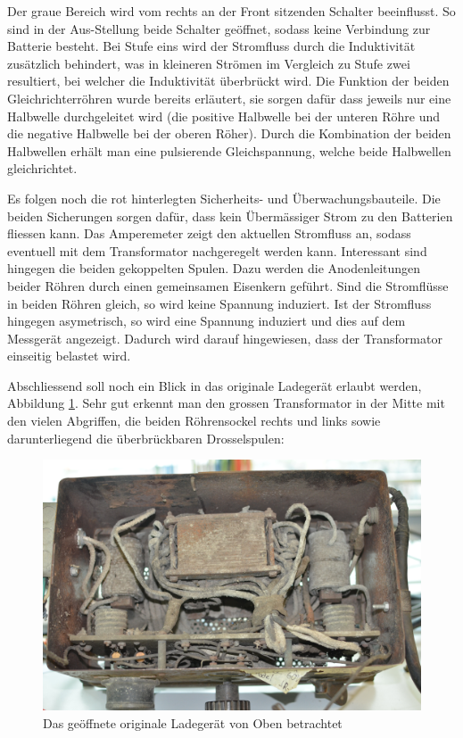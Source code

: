 Der graue Bereich wird vom rechts an der Front sitzenden Schalter beeinflusst. So sind in der Aus-Stellung beide Schalter geöffnet, sodass keine Verbindung zur Batterie besteht. Bei Stufe eins wird der Stromfluss durch die Induktivität zusätzlich behindert, was in kleineren Strömen im Vergleich zu Stufe zwei resultiert, bei welcher die Induktivität überbrückt wird. Die Funktion der beiden Gleichrichterröhren wurde bereits erläutert, sie sorgen dafür dass jeweils nur eine Halbwelle durchgeleitet wird (die positive Halbwelle bei der unteren Röhre und die negative Halbwelle bei der oberen Röher). Durch die Kombination der beiden Halbwellen erhält man eine pulsierende Gleichspannung, welche beide Halbwellen gleichrichtet.

Es folgen noch die rot hinterlegten Sicherheits- und Überwachungsbauteile. Die beiden Sicherungen sorgen dafür, dass kein Übermässiger Strom zu den Batterien fliessen kann. Das Amperemeter zeigt den aktuellen Stromfluss an, sodass eventuell mit dem Transformator nachgeregelt werden kann. Interessant sind hingegen die beiden gekoppelten Spulen. Dazu werden die Anodenleitungen beider Röhren durch einen gemeinsamen Eisenkern geführt. Sind die Stromflüsse in beiden Röhren gleich, so wird keine Spannung induziert. Ist der Stromfluss hingegen asymetrisch, so wird eine Spannung induziert und dies auf dem Messgerät angezeigt. Dadurch wird darauf hingewiesen, dass der Transformator einseitig belastet wird.

Abschliessend soll noch ein Blick in das originale Ladegerät erlaubt werden, Abbildung \ref{fig:Ladegeraet_Original}. Sehr gut erkennt man den grossen Transformator in der Mitte mit den vielen Abgriffen, die beiden Röhrensockel rechts und links sowie darunterliegend die überbrückbaren Drosselspulen:

\begin{figure}[h]
	\centering
		\includegraphics[width=1.0\textwidth]{images/Ladegeraet_Original.JPG}
	\caption{Das geöffnete originale Ladegerät von Oben betrachtet}
	\label{fig:Ladegeraet_Original}
\end{figure}

\newpage